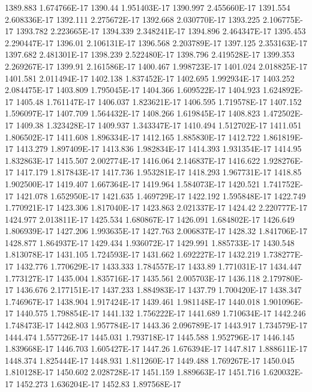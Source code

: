 1389.883  1.674766E-17
1390.44  1.951403E-17
1390.997  2.455660E-17
1391.554  2.608336E-17
1392.111  2.275672E-17
1392.668  2.030770E-17
1393.225  2.106775E-17
1393.782  2.223665E-17
1394.339  2.348241E-17
1394.896  2.464347E-17
1395.453  2.290447E-17
1396.01  2.106131E-17
1396.568  2.203789E-17
1397.125  2.353163E-17
1397.682  2.481301E-17
1398.239  2.522480E-17
1398.796  2.419528E-17
1399.353  2.269267E-17
1399.91  2.161586E-17
1400.467  1.998723E-17
1401.024  2.018825E-17
1401.581  2.011494E-17
1402.138  1.837452E-17
1402.695  1.992934E-17
1403.252  2.084475E-17
1403.809  1.795045E-17
1404.366  1.609522E-17
1404.923  1.624892E-17
1405.48  1.761147E-17
1406.037  1.823621E-17
1406.595  1.719578E-17
1407.152  1.596097E-17
1407.709  1.564432E-17
1408.266  1.619845E-17
1408.823  1.472502E-17
1409.38  1.323428E-17
1409.937  1.343347E-17
1410.494  1.512702E-17
1411.051  1.806502E-17
1411.608  1.896334E-17
1412.165  1.885830E-17
1412.722  1.861819E-17
1413.279  1.897409E-17
1413.836  1.982834E-17
1414.393  1.931354E-17
1414.95  1.832863E-17
1415.507  2.002774E-17
1416.064  2.146837E-17
1416.622  1.928276E-17
1417.179  1.817843E-17
1417.736  1.953281E-17
1418.293  1.967731E-17
1418.85  1.902500E-17
1419.407  1.667364E-17
1419.964  1.584073E-17
1420.521  1.741752E-17
1421.078  1.652950E-17
1421.635  1.469729E-17
1422.192  1.595848E-17
1422.749  1.770921E-17
1423.306  1.817040E-17
1423.863  2.021337E-17
1424.42  2.220777E-17
1424.977  2.013811E-17
1425.534  1.680867E-17
1426.091  1.684802E-17
1426.649  1.806939E-17
1427.206  1.993635E-17
1427.763  2.006837E-17
1428.32  1.841706E-17
1428.877  1.864937E-17
1429.434  1.936072E-17
1429.991  1.885733E-17
1430.548  1.813078E-17
1431.105  1.724593E-17
1431.662  1.692227E-17
1432.219  1.738277E-17
1432.776  1.770629E-17
1433.333  1.784557E-17
1433.89  1.771031E-17
1434.447  1.773127E-17
1435.004  1.835716E-17
1435.561  2.005703E-17
1436.118  2.179780E-17
1436.676  2.177151E-17
1437.233  1.884983E-17
1437.79  1.700420E-17
1438.347  1.746967E-17
1438.904  1.917424E-17
1439.461  1.981148E-17
1440.018  1.901096E-17
1440.575  1.798854E-17
1441.132  1.756222E-17
1441.689  1.710634E-17
1442.246  1.748473E-17
1442.803  1.957784E-17
1443.36  2.096789E-17
1443.917  1.734579E-17
1444.474  1.557726E-17
1445.031  1.793718E-17
1445.588  1.952796E-17
1446.145  1.839668E-17
1446.703  1.605427E-17
1447.26  1.676394E-17
1447.817  1.888611E-17
1448.374  1.825444E-17
1448.931  1.811260E-17
1449.488  1.769267E-17
1450.045  1.810128E-17
1450.602  2.028728E-17
1451.159  1.889663E-17
1451.716  1.620032E-17
1452.273  1.636204E-17
1452.83  1.897568E-17
